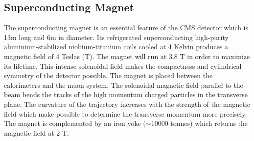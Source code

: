 \subsection{Superconducting Magnet}
The superconducting magnet is an essential feature of the CMS detector which is 13m long and 6m in diameter. Its refrigerated superconducting high-purity aluminium-stabilized niobium-titanium coils cooled at 4 Kelvin produces a magnetic field of 4 Teslas (T). The magnet will run at 3.8 T in order to maximize its lifetime. This intense solenoidal field makes the compactness and cylindrical symmetry of the detector possible. The magnet is placed between the calorimeters and the muon system. The solenoidal magnetic field parallel to the beam bends the tracks of the high momentum charged particles in the transverse plane. The curvature of the trajectory increases with the strength of the magnetic field which make possible to determine the transverse momentum more precisely. The magnet is complemented by an iron yoke ($\sim$10000 tonnes) which returns the magnetic field at 2 T.

